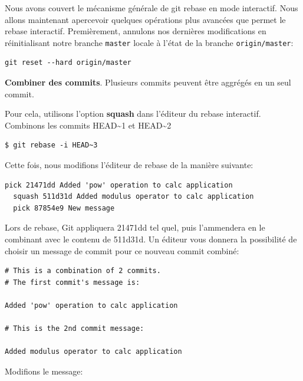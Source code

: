 \documentclass{../../common/tufte-latex/tufte-handout}
\begin{document}
\noindent Nous avons couvert le mécanisme générale de git rebase en mode interactif. Nous allons maintenant apercevoir quelques opérations plus avancées que permet le rebase interactif.
Premièrement, annulons nos dernières modifications en réinitialisant notre branche \texttt{master} locale à l'état de la branche \texttt{origin/master}:

\begin{lstlisting}[style=BashInputStyle]
  git reset --hard origin/master
\end{lstlisting}

\noindent \textbf{Combiner des commits}.
Plusieurs commits peuvent être aggrégés en un seul commit.

Pour cela, utilisons l'option \textbf{squash} dans l'éditeur du rebase interactif.
Combinons les commits HEAD\textasciitilde1 et HEAD\textasciitilde2

\begin{lstlisting}[style=BashInputStyle]
  $ git rebase -i HEAD~3
\end{lstlisting}

Cette fois, nous modifions l'éditeur de rebase de la manière suivante:

\begin{lstlisting}[style=BashInputStyle]
  pick 21471dd Added 'pow' operation to calc application
  squash 511d31d Added modulus operator to calc application
  pick 87854e9 New message
\end{lstlisting}

Lors de rebase, Git appliquera 21471dd tel quel, puis l'ammendera en le combinant avec le contenu de 511d31d.
Un éditeur vous donnera la possibilité de choisir un message de commit pour ce nouveau commit combiné:

\begin{lstlisting}[style=BashInputStyle]
# This is a combination of 2 commits.
# The first commit's message is:

Added 'pow' operation to calc application

# This is the 2nd commit message:

Added modulus operator to calc application
\end{lstlisting}

Modifions le message:
\end{document}
